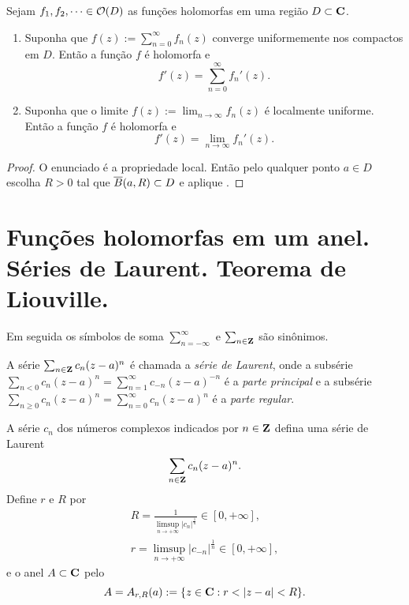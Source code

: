 \begin{teorema}[Weierstrass]
\label{t:weierstrass}
Sejam $f_1,f_2,\dots \in \mathcal{O}(D)$ as funções holomorfas em uma região $D\subset \mathbf{C}$.
\begin{enumerate}
\item
Suponha que $f(z) := \sum_{n=0}^\infty f_n(z)$ converge uniformemente
nos compactos em $D$. Então a função $f$ é holomorfa e
\[ f'(z) = \sum_{n=0}^\infty f_n'(z). \]
\item
Suponha que o limite $f(z) := \lim_{n\to\infty} f_n(z)$ é localmente uniforme.
Então a função $f$ é holomorfa e
\[ f'(z) = \lim_{n\to\infty} f_n'(z). \]
\end{enumerate}
\end{teorema}
\begin{proof}
O enunciado é a propriedade local.
Então pelo qualquer ponto $a\in D$ escolha $R>0$ tal que $\overline{B}(a,R) \subset D$
e aplique .
\end{proof}

\section{Funções holomorfas em um anel. Séries de Laurent. Teorema de Liouville.}

Em seguida os símbolos de soma $\sum_{n=-\infty}^\infty$
e $\sum_{n\in\mathbf{Z}}$ são sinônimos.

\begin{defin}
A série $\sum_{n\in\mathbf{Z}} c_n (z-a)^n$ é chamada
a \emph{série de Laurent},
onde a subsérie $\sum_{n<0} c_n (z-a)^n = \sum_{n=1}^\infty c_{-n} (z-a)^{-n}$
é a \emph{parte principal}
e a subsérie $\sum_{n\geq 0} c_n (z-a)^n = \sum_{n=0}^\infty c_n (z-a)^n$
é a \emph{parte regular}.
\end{defin}

A série $c_n$ dos números complexos indicados por $n\in\mathbf{Z}$
defina uma série de Laurent
\[ \sum_{n\in\mathbf{Z}} c_n (z-a)^n. \]
Define $r$ e $R$ por
\begin{align*}
R = \frac1{\limsup_{n\to+\infty} |c_n|^{\frac1n}} \in [0,+\infty], \\
r = \limsup_{n\to+\infty} |c_{-n}|^{\frac1n} \in [0,+\infty],
\end{align*}
e o anel $A\subset \mathbf{C}$ pelo
\[ A = A_{r,R}(a) := \{ z\in\mathbf{C} : r < |z-a| < R \}. \]

